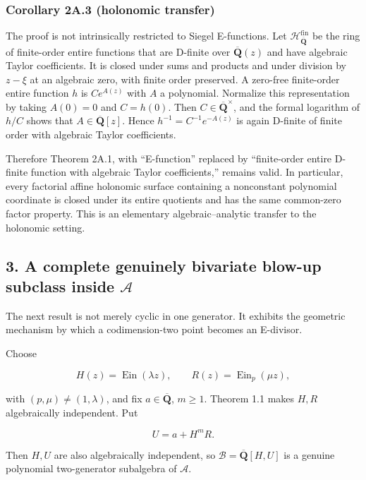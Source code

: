 \documentclass[11pt]{article}
\theoremstyle{keio}
\theoremstyle{definition}
\theoremstyle{remark}
\begin{document}
\subsubsection{Corollary 2A.3 (holonomic transfer)}

The proof is not intrinsically restricted to Siegel E-functions. Let
\(\mathcal H_{\overline{\mathbf Q}}^{\mathrm{fin}}\) be the ring of
finite-order entire functions that are D-finite over
\(\overline{\mathbf Q}(z)\) and have algebraic Taylor coefficients. It is
closed under sums and products and under division by \(z-\xi\) at an
algebraic zero, with finite order preserved. A zero-free finite-order entire
function \(h\) is \(Ce^{A(z)}\) with \(A\) a polynomial. Normalize this
representation by taking \(A(0)=0\) and \(C=h(0)\). Then
\(C\in\overline{\mathbf Q}^{\times}\), and the formal logarithm of \(h/C\)
shows that \(A\in\overline{\mathbf Q}[z]\). Hence \(h^{-1}=C^{-1}e^{-A(z)}\)
is again D-finite of finite order with algebraic Taylor coefficients.

Therefore Theorem 2A.1, with ``E-function'' replaced by ``finite-order entire
D-finite function with algebraic Taylor coefficients,'' remains valid. In
particular, every factorial affine holonomic surface containing a nonconstant
polynomial coordinate is closed under its entire quotients and has the same
common-zero factor property. This is an elementary algebraic--analytic
transfer to the holonomic setting.

\subsection{\texorpdfstring{3. A complete genuinely bivariate blow-up subclass inside \(\mathscr A\)}{3. A complete genuinely bivariate blow-up subclass inside \textbackslash mathscr A}}

The next result is not merely cyclic in one generator. It exhibits the
geometric mechanism by which a codimension-two point becomes an E-divisor.

Choose

\[
  H(z)=\operatorname{Ein}(\lambda z),\qquad
  R(z)=\operatorname{Ein}_p(\mu z),
\]

with \((p,\mu)\ne(1,\lambda)\), and fix
\(a\in\overline{\mathbf Q}\), \(m\ge1\). Theorem 1.1 makes \(H,R\)
algebraically independent. Put

\[
  U=a+H^mR.                                                   \tag{J-3.1}
\]

Then \(H,U\) are also algebraically independent, so
\(\mathscr B=\overline{\mathbf Q}[H,U]\) is a genuine polynomial
two-generator subalgebra of \(\mathscr A\).
\end{document}
